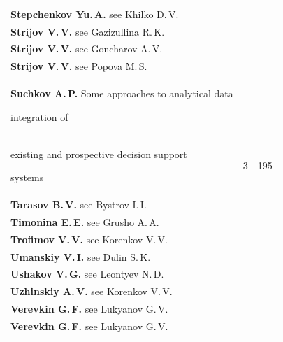 {\begin{tabular}{p{311pt}rr}
\textbf{Stepchenkov Yu.\,A.} see Khilko D.\,V.&&\\[-.35pt]


\textbf{Strijov V.\,V.} see Gazizullina R.\,K.&&\\[-.35pt]


\textbf{Strijov V.\,V.} see Goncharov A.\,V.&&\\[-.35pt]


\textbf{Strijov V.\,V.} see Popova M.\,S.&&\\[-.35pt]


\textbf{Suchkov A.\,P.} Some approaches to analytical data


integration of\linebreak


\\[-12pt]


\hspace*{21pt}existing and prospective decision support


systems&3&195\\[-.35pt]


\textbf{Tarasov B.\,V.} see Bystrov I.\,I.&&\\[-.35pt]


\textbf{Timonina E.\,E.} see Grusho A.\,A.&&\\[-.35pt]


\textbf{Trofimov V.\,V.} see Korenkov V.\,V.&&\\[-.35pt]


\textbf{Umanskiy V.\,I.} see Dulin S.\,K.&&\\[-.35pt]


\textbf{Ushakov V.\,G.} see Leontyev N.\,D.&&\\[-.35pt]


\textbf{Uzhinskiy A.\,V.} see Korenkov V.\,V.&&\\[-.35pt]


\textbf{Verevkin G.\,F.} see Lukyanov G.\,V.&&\\[-.35pt]


\textbf{Verevkin G.\,F.} see Lukyanov G.\,V.&&\\[-.5pt]


\end{tabular}


}





\pagebreak





\def\rightkol{2015 AUTHOR INDEX}



